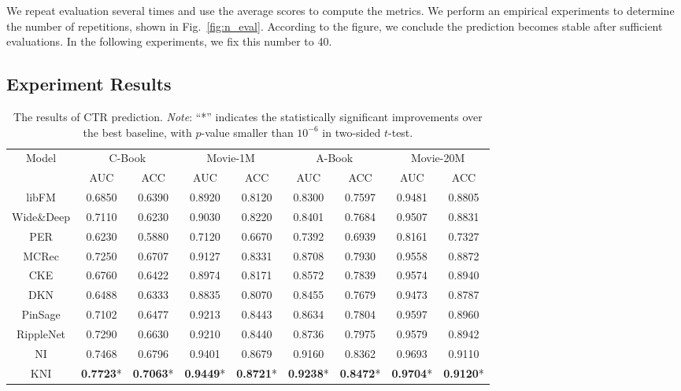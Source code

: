 \documentclass[sigconf]{acmart}
\begin{document}
We repeat evaluation several times and use the average scores to compute the metrics. We perform an empirical experiments to determine the number of repetitions, shown in Fig.~\ref{fig:n_eval}. According to the figure, we conclude the prediction becomes stable after sufficient evaluations.
In the following experiments, we fix this number to 40.

\subsection{Experiment Results}


\begin{table*}
\centering
\caption{The results of CTR prediction. \emph{Note}: ``*'' indicates the statistically significant improvements over the best baseline, with $p$-value smaller than $10^{-6}$ in two-sided $t$-test.}\label{tab:ctr}
\begin{tabular}{c|cc|cc|cc|cc} \hline
\multirow{2}{*}{Model} & \multicolumn{2}{|c|}{C-Book} & \multicolumn{2}{|c|}{Movie-1M} & \multicolumn{2}{|c|}{A-Book} & \multicolumn{2}{|c}{Movie-20M} \\ \cline{2-9}
& AUC & ACC & AUC & ACC & AUC & ACC & AUC & ACC \\ \hline\hline
libFM & 0.6850 & 0.6390 & 0.8920 & 0.8120 &	0.8300 & 0.7597 & 0.9481 & 0.8805\\
Wide\&Deep & 0.7110 & 0.6230 & 0.9030 &	0.8220 & 0.8401 & 0.7684 & 0.9507 &	0.8831 \\ \hline
PER & 0.6230 & 0.5880 & 0.7120 & 0.6670 & 0.7392 & 0.6939 & 0.8161 & 0.7327 \\
MCRec & 0.7250 & 0.6707 & 0.9127 & 0.8331 & 0.8708 & 0.7930 & 0.9558 & 0.8872 \\ \hline
CKE & 0.6760 & 0.6422 & 0.8974 & 0.8171 & 0.8572 & 0.7839 & 0.9574 & 0.8940 \\
DKN & 0.6488 & 0.6333 & 0.8835 & 0.8070 & 0.8455 & 0.7679 & 0.9473 & 0.8787 \\ 
PinSage & 0.7102 & 0.6477 & 0.9213 & 0.8443 & 0.8634 & 0.7804 & 0.9597 & 0.8960 \\
RippleNet & 0.7290 & 0.6630 & 0.9210 & 0.8440 & 0.8736 & 0.7975 & 0.9579 & 0.8942\\ \hline
NI & 0.7468 & 0.6796 & 0.9401 & 0.8679 & 0.9160 & 0.8362 & 0.9693 & 0.9110 \\
KNI & \textbf{0.7723}* & \textbf{0.7063}* & \textbf{0.9449}* & \textbf{0.8721}* & \textbf{0.9238}* & \textbf{0.8472}* & \textbf{0.9704}* & \textbf{0.9120}* \\ \hline
\end{tabular}
\end{table*}
\end{document}
